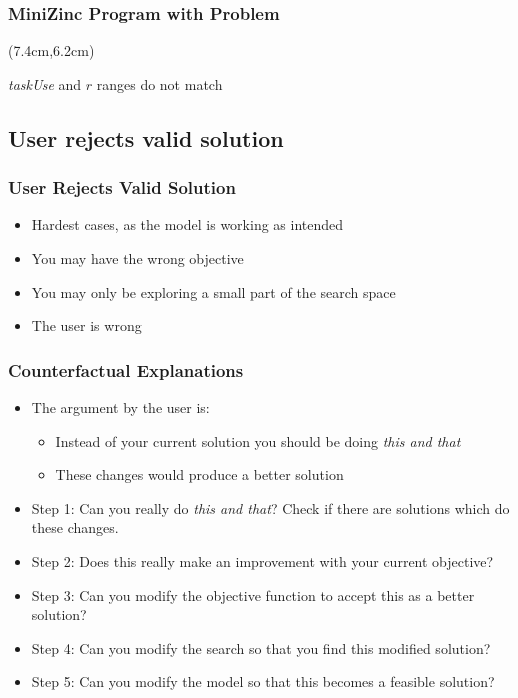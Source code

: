 \documentclass[dvipsnames,aspectratio=169]{beamer}
\begin{document}
\begin{frame}[fragile]
\frametitle{MiniZinc Program with Problem}

\begin{textblock*}{6cm}(7.4cm,6.2cm)
\emph{taskUse} and $r$ ranges do not match
\end{textblock*}

\end{frame}

\subsection{User rejects valid solution}

\begin{frame}
\frametitle{User Rejects Valid Solution}
\begin{itemize}
\item Hardest cases, as the model is working as intended
\item You may have the wrong objective
\item You may only be exploring a small part of the search space
\item The user is wrong
\end{itemize}
\end{frame}

\begin{frame}
\frametitle{Counterfactual Explanations}
\begin{itemize}
\item The argument by the user is:
\begin{itemize}
\item Instead of your current solution you should be doing \textit{this and that}
\item These changes would produce a better solution
\end{itemize}
\item Step 1: Can you really do \textit{this and that}? Check if there are solutions which do these changes.
\item Step 2: Does this really make an improvement with your current objective?
\item Step 3: Can you modify the objective function to accept this as a better solution?
\item Step 4: Can you modify the search so that you find this modified solution?
\item Step 5: Can you modify the model so that this becomes a feasible solution?
\end{itemize}
\end{frame}
\end{document}
